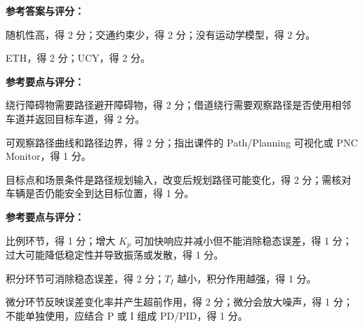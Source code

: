 \exampagebreak
{}

{\textbf{参考答案与评分：}
\begin{subquestions}
\item 随机性高，得 2 分；交通约束少，得 2 分；没有运动学模型，得 2 分。
\item ETH，得 2 分；UCY，得 2 分。
\end{subquestions}}

{\textbf{参考要点与评分：}
\begin{subquestions}
\item 绕行障碍物需要路径避开障碍物，得 2 分；借道绕行需要观察路径是否使用相邻车道并返回目标车道，得 2 分。
\item 可观察路径曲线和路径边界，得 2 分；指出课件的 Path/Planning 可视化或 PNC Monitor，得 1 分。
\item 目标点和场景条件是路径规划输入，改变后规划路径可能变化，得 2 分；需核对车辆是否仍能安全到达目标位置，得 1 分。
\end{subquestions}}

{\textbf{参考要点与评分：}
\begin{subquestions}
\item 比例环节，得 1 分；增大 $K_p$ 可加快响应并减小但不能消除稳态误差，得 1 分；过大可能降低稳定性并导致振荡或发散，得 1 分。
\item 积分环节可消除稳态误差，得 2 分；$T_I$ 越小，积分作用越强，得 1 分。
\item 微分环节反映误差变化率并产生超前作用，得 2 分；微分会放大噪声，得 1 分；不能单独使用，应结合 P 或 I 组成 PD/PID，得 1 分。
\end{subquestions}}

